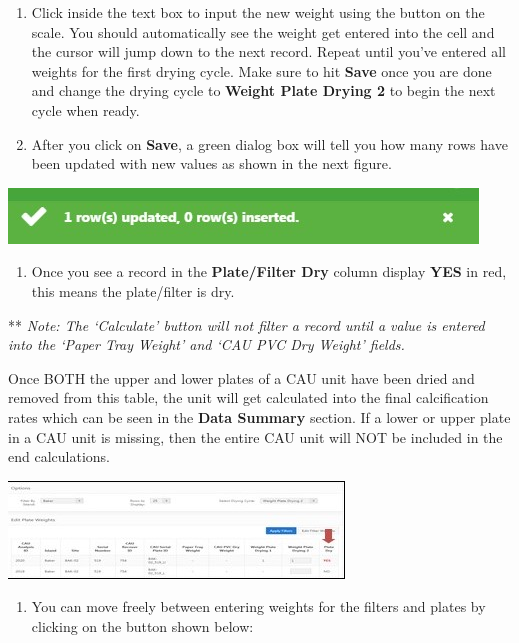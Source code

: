 \documentclass[]{book}
\providecommand{\tightlist}{%
  \setlength{\itemsep}{0pt}\setlength{\parskip}{0pt}}
\begin{document}
\begin{enumerate}
\def\labelenumi{\arabic{enumi}.}
\setcounter{enumi}{4}
\item
  Click inside the text box to input the new weight using the button on the scale. You should automatically see the weight get entered into the cell and the cursor will jump down to the next record. Repeat until you've entered all weights for the first drying cycle. Make sure to hit \textbf{Save} once you are done and change the drying cycle to \textbf{Weight Plate Drying 2} to begin the next cycle when ready.
\item
  After you click on \textbf{Save}, a green dialog box will tell you how many rows have been updated with new values as shown in the next figure.
\end{enumerate}

\includegraphics{images/Data13.jpg}

\begin{enumerate}
\def\labelenumi{\arabic{enumi}.}
\setcounter{enumi}{6}
\tightlist
\item
  Once you see a record in the \textbf{Plate/Filter Dry} column display \textbf{YES} in red, this means the plate/filter is dry.
\end{enumerate}

** \emph{Note: The `Calculate' button will not filter a record until a value is entered into the `Paper Tray Weight' and `CAU PVC Dry Weight' fields.}

Once BOTH the upper and lower plates of a CAU unit have been dried and removed from this table, the unit will get calculated into the final calcification rates which can be seen in the \textbf{Data Summary} section. If a lower or upper plate in a CAU unit is missing, then the entire CAU unit will NOT be included in the end calculations.

\includegraphics{images/Data14.jpg}

\begin{enumerate}
\def\labelenumi{\arabic{enumi}.}
\setcounter{enumi}{7}
\tightlist
\item
  You can move freely between entering weights for the filters and plates by clicking on the button shown below:
\end{enumerate}
\end{document}
